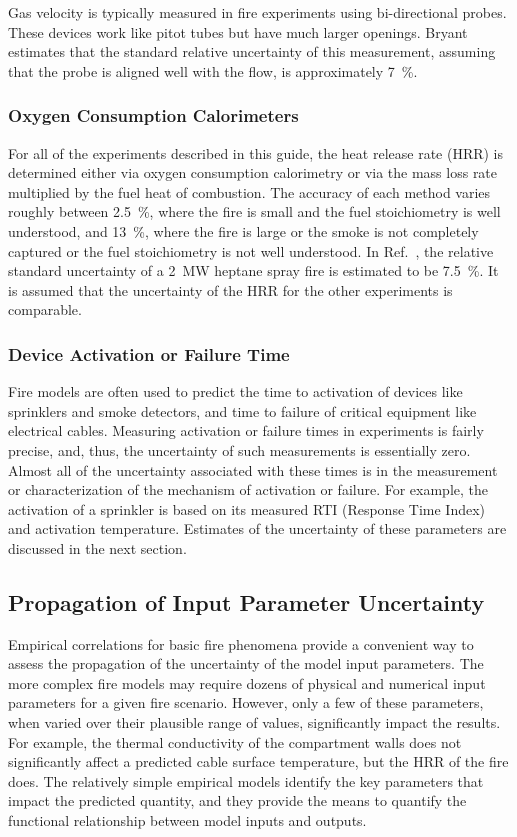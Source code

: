 Gas velocity is typically measured in fire experiments using bi-directional probes. These devices work like pitot tubes but have much larger openings. Bryant~\cite{Bryant:FSJ2009} estimates that the standard relative uncertainty of this measurement, assuming that the probe is aligned well with the flow, is approximately 7~\%.

\subsubsection{Oxygen Consumption Calorimeters}

For all of the experiments described in this guide, the heat release rate (HRR) is determined either via oxygen consumption calorimetry or via the mass loss rate multiplied by the fuel heat of combustion. The accuracy of each method varies roughly between 2.5~\%, where the fire is small and the fuel stoichiometry is well understood, and 13~\%, where the fire is large or the smoke is not completely captured or the fuel stoichiometry is not well understood. In Ref.~\cite{Hamins:SP1013-1}, the relative standard uncertainty of a 2~MW heptane spray fire is estimated to be 7.5~\%. It is assumed that the uncertainty of the HRR for the other experiments is comparable.

\subsubsection{Device Activation or Failure Time}

Fire models are often used to predict the time to activation of devices like sprinklers and smoke detectors, and time to failure of critical equipment like electrical cables. Measuring activation or failure times in experiments is fairly precise, and, thus, the uncertainty of such measurements is essentially zero. Almost all of the uncertainty associated with these times is in the measurement or characterization of the mechanism of activation or failure. For example, the activation of a sprinkler is based on its measured RTI (Response Time Index) and activation temperature. Estimates of the uncertainty of these parameters are discussed in the next section.

\subsection{Propagation of Input Parameter Uncertainty}

Empirical correlations for basic fire phenomena provide a convenient way to assess the propagation of the uncertainty of the model input parameters. The more complex fire models may require dozens of physical and numerical input parameters for a given fire scenario.  However, only a few of these parameters, when varied over their plausible range of values, significantly impact the results. For example, the thermal conductivity of the compartment walls does not significantly affect a predicted cable surface temperature, but the HRR of the fire does. The relatively simple empirical models identify the key parameters that impact the predicted quantity, and they provide the means to quantify the functional relationship between model inputs and outputs.

